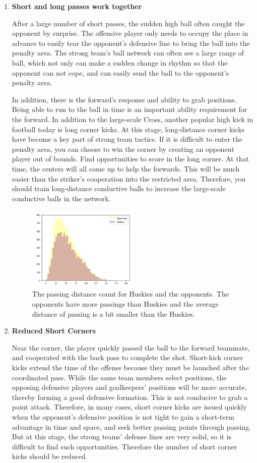 \documentclass{mcmthesis}
\begin{document}
\begin{enumerate}[(1)]
	\item \textbf{Short and long passes work together}\par
	\qquad After a large number of short passes, the sudden high ball often caught the opponent by surprise. The offensive player only needs to occupy the place in advance to easily tear the opponent's defensive line to bring the ball into the penalty area. The strong team's ball network can often see a large range of ball, which not only can make a sudden change in rhythm so that the opponent can not cope, and can easily send the ball to the opponent's penalty area.\par
	\qquad In addition, there is the forward's response and ability to grab positions. Being able to run to the ball in time is an important ability requirement for the forward. In addition to the large-scale Cross, another popular high kick in football today is long corner kicks. At this stage, long-distance corner kicks have become a key part of strong team tactics. If it is difficult to enter the penalty area, you can choose to win the corner by creating an opponent player out of bounds. Find opportunities to score in the long corner. At that time, the centers will all come up to help the forwards. This will be much easier than the striker's cooperation into the restricted area. Therefore, you should train long-distance conductive balls to increase the large-scale conductive balls in the network.
	\begin{figure}[htbp]
		\centering
		\includegraphics[width=0.5\textwidth]{figures/passing_cnt.png}
		\caption{The passing distance count for Huskies and the opponents. The opponents have more passings than Huskies and the average distance of passing is a bit smaller than  the Huskies.}
		\label{fig:passing_cnt}
	\end{figure}
	\item \textbf{Reduced Short Corners}\par
	\qquad Near the corner, the player quickly passed the ball to the forward teammate, and cooperated with the back pass to complete the shot. Short-kick corner kicks extend the time of the offense because they must be launched after the coordinated pass. While the same team members select positions, the opposing defensive players and goalkeepers' positions will be more accurate, thereby forming a good defensive formation. This is not conducive to grab a point attack. Therefore, in many cases, short corner kicks are issued quickly when the opponent's defensive position is not tight to gain a short-term advantage in time and space, and seek better passing points through passing. But at this stage, the strong teams' defense lines are very solid, so it is difficult to find such opportunities. Therefore the number of short corner kicks should be reduced.

\end{enumerate}
\end{document}
